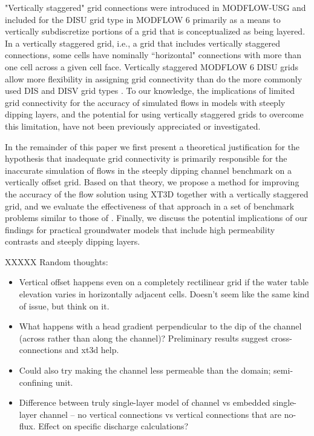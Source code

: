\documentclass{article}
\begin{document}
"Vertically staggered" grid connections were introduced in MODFLOW-USG \citep{modflowusg} and included for the DISU grid type in MODFLOW 6 \citep{modflow6gwf} primarily as a means to vertically subdiscretize portions of a grid that is conceptualized as being layered. In a vertically staggered grid, i.e., a grid that includes vertically staggered connections, some cells have nominally ``horizontal" connections with more than one cell across a given cell face. Vertically staggered MODFLOW 6 DISU grids allow more flexibility in assigning grid connectivity than do the more commonly used DIS and DISV grid types \citep{modflow6gwf}. To our knowledge, the implications of limited grid connectivity for the accuracy of simulated flows in models with steeply dipping layers, and the potential for using vertically staggered grids to overcome this limitation, have not been previously appreciated or investigated.

In the remainder of this paper we first present a theoretical justification for the hypothesis that inadequate grid connectivity is primarily responsible for the inaccurate simulation of flows in the steeply dipping channel benchmark on a vertically offset grid. Based on that theory, we propose a method for improving the accuracy of the flow solution using XT3D together with a vertically staggered grid, and we evaluate the effectiveness of that approach in a set of benchmark problems similar to those of \cite{bardot2022}. Finally, we discuss the potential implications of our findings for practical groundwater models that include high permeability contrasts and steeply dipping layers.

XXXXX Random thoughts:
\begin{itemize}
	\item Vertical offset happens even on a completely rectilinear grid if the water table elevation varies in horizontally adjacent cells. Doesn't seem like the same kind of issue, but think on it.
	\item What happens with a head gradient perpendicular to the dip of the channel (across rather than along the channel)? Preliminary results suggest cross-connections and xt3d help.
	\item Could also try making the channel less permeable than the domain; semi-confining unit.
	\item Difference between truly single-layer model of channel vs embedded single-layer channel -- no vertical connections vs vertical connections that are no-flux. Effect on specific discharge calculations?
\end{itemize}
\end{document}
